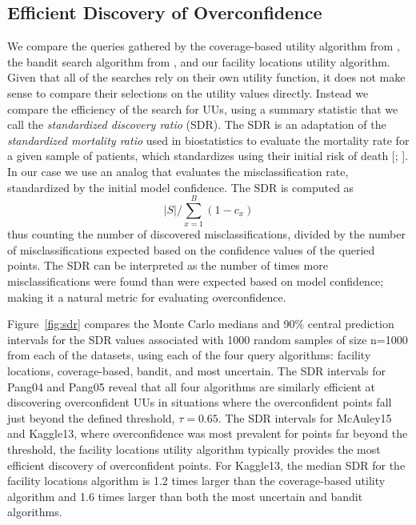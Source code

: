 \documentclass[letterpaper]{article} %
\begin{document}
\subsection{Efficient Discovery of Overconfidence}

We compare the queries gathered by the coverage-based utility algorithm from \cite{Bansal2018}, the bandit search algorithm from \cite{Lakkaraju2016}, and our facility locations utility algorithm. Given that all of the searches rely on their own utility function, it does not make sense to compare their selections on the utility values directly. Instead we compare the efficiency of the search for UUs, using a summary statistic that we call the \textit{standardized discovery ratio} (SDR). The SDR is an adaptation of the \textit{standardized mortality ratio} used in biostatistics to evaluate the mortality rate for a given sample of patients, which standardizes using their initial risk of death [\citealt{taylor2013standardized}; \citealt{rosner2015fundamentals}]. In our case we use an analog that evaluates the misclassification rate, standardized by the initial model confidence. The SDR is computed as 
$$ |S| / \sum_{x=1}^B(1- c_x) $$
thus counting the number of discovered misclassifications, divided by the number of misclassifications expected based on the confidence values of the queried points. The SDR can be interpreted as the number of times more misclassifications were found than were expected based on model confidence; making it a natural metric for evaluating overconfidence.

Figure~\ref{fig:sdr} compares the Monte Carlo medians and 90\%  central prediction intervals for the SDR values associated with 1000 random samples of size n=1000 from each of the datasets, using each of the four query algorithms: facility locations, coverage-based, bandit, and most uncertain. The SDR intervals for Pang04 and Pang05 reveal that all four algorithms are similarly efficient at discovering overconfident UUs in situations where the overconfident points fall just beyond the defined threshold, $\tau = 0.65$. The SDR intervals for McAuley15 and Kaggle13, where overconfidence was most prevalent for points far beyond the threshold, the facility locations utility algorithm typically provides the most efficient discovery of overconfident points. For Kaggle13, the median SDR for the facility locations algorithm is 1.2 times larger than the coverage-based utility algorithm and 1.6 times larger than both the most uncertain and bandit algorithms.
\end{document}
